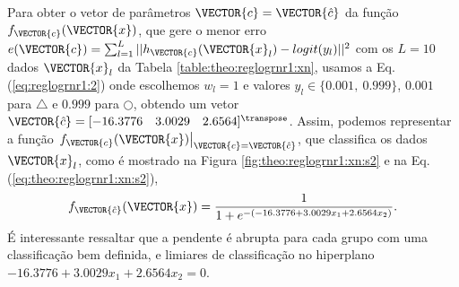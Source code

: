 \begin{SolutionT}\label{sol:theo:reglogrnr1:s2}
Para obter o vetor de parâmetros $\VECTOR{c}=\VECTOR{\hat{c}}$ da função $f_{\VECTOR{c}}(\VECTOR{x})$, 
que gere o menor erro $e(\VECTOR{c}) =  \sum_{l=1}^{L} ||h_{\VECTOR{c}}(\VECTOR{x}_l)-logit(y_l)||^2$
com os $L=10$ dados $\VECTOR{x}_l$ da Tabela \ref{table:theo:reglogrnr1:xn},
usamos a Eq. (\ref{eq:reglogrnr1:2}) onde escolhemos $w_l=1$ e valores $y_l \in \{0.001,~ 0.999\}$,
$0.001$ para $\bigtriangleup$ e $0.999$ para $\bigcirc$,
obtendo um vetor $\VECTOR{\hat{c}}=[-16.3776\quad 3.0029\quad 2.6564]^{\transpose}$. 
Assim, podemos representar a função $\left.f_{\VECTOR{c}}(\VECTOR{x})\right|_{\VECTOR{c}=\VECTOR{\hat{c}}}$, 
que classifica os dados $\VECTOR{x}_l$, 
como é mostrado na Figura \ref{fig:theo:reglogrnr1:xn:s2} e na Eq. (\ref{eq:theo:reglogrnr1:xn:s2}),
\begin{equation}\label{eq:theo:reglogrnr1:xn:s2}
f_{\VECTOR{\hat{c}}}(\VECTOR{x})= \frac{1}{1+e^{-(-16.3776+3.0029 x_1 +2.6564 x_2)}}.
\end{equation}
É interessante ressaltar que a pendente é abrupta para cada grupo com uma classificação bem definida,
e limiares de classificação no hiperplano $-16.3776+3.0029 x_1 +2.6564 x_2=0$.
\end{SolutionT}
